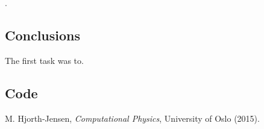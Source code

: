 \documentclass[11pt]{article}
\begin{document}

    .


\subsection{Conclusions}

    The first task was to.

\subsection{Code}


\begin{thebibliography}{1}

    M. Hjorth-Jensen, {\em Computational Physics}, University of Oslo (2015). 

\end{thebibliography}
\end{document}
